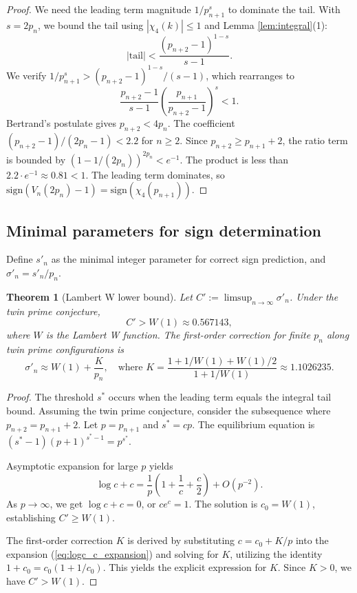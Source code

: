 \documentclass[12pt]{article}
\theoremstyle{plain}
\newtheorem{theorem}{Theorem}
\theoremstyle{definition}
\theoremstyle{remark}
\begin{document}
\begin{proof}
We need the leading term magnitude $1/p_{n+1}^s$ to dominate the tail. With $s = 2p_n$, we bound the tail using $|\chi_4(k)| \leq 1$ and Lemma \ref{lem:integral}(1):
\[
|\text{tail}| < \frac{(p_{n+2}-1)^{1-s}}{s-1}.
\]
We verify $1/p_{n+1}^s > (p_{n+2}-1)^{1-s}/(s-1)$, which rearranges to
\[
\frac{p_{n+2}-1}{s-1} \left(\frac{p_{n+1}}{p_{n+2}-1}\right)^s < 1.
\]
Bertrand's postulate gives $p_{n+2} < 4p_n$. The coefficient $(p_{n+2}-1)/(2p_n-1) < 2.2$ for $n \geq 2$. Since $p_{n+2} \geq p_{n+1} + 2$, the ratio term is bounded by $(1 - 1/(2p_n))^{2p_n} < e^{-1}$. The product is less than $2.2 \cdot e^{-1} \approx 0.81 < 1$.
The leading term dominates, so $\text{sign}(V_n(2p_n) - 1) = \text{sign}(\chi_4(p_{n+1}))$.
\end{proof}

\subsection{Minimal parameters for sign determination}

Define $s'_n$ as the minimal integer parameter for correct sign prediction, and $\sigma'_n = s'_n/p_n$.

\begin{theorem}[Lambert W lower bound]
\label{thm:lambert}
Let $C' := \limsup_{n \to \infty} \sigma'_n$. Under the twin prime conjecture,
\[
C' > W(1) \approx 0.567143,
\]
where $W$ is the Lambert W function. The first-order correction for finite $p_n$ along twin prime configurations is
\[
\sigma'_n \approx W(1) + \frac{K}{p_n}, \quad \text{where } K = \frac{1 + 1/W(1) + W(1)/2}{1 + 1/W(1)} \approx 1.1026235.
\]
\end{theorem}

\begin{proof}
The threshold $s^*$ occurs when the leading term equals the integral tail bound. Assuming the twin prime conjecture, consider the subsequence where $p_{n+2} = p_{n+1} + 2$. Let $p = p_{n+1}$ and $s^* = cp$. The equilibrium equation is $(s^*-1)(p+1)^{s^*-1} = p^{s^*}$.

Asymptotic expansion for large $p$ yields
\begin{equation}
\label{eq:logc_c_expansion}
\log c + c = \frac{1}{p}\left(1 + \frac{1}{c} + \frac{c}{2}\right) + O(p^{-2}).
\end{equation}
As $p \to \infty$, we get $\log c + c = 0$, or $c e^c = 1$. The solution is $c_0 = W(1)$, establishing $C' \geq W(1)$.

The first-order correction $K$ is derived by substituting $c = c_0 + K/p$ into the expansion (\ref{eq:logc_c_expansion}) and solving for $K$, utilizing the identity $1+c_0 = c_0(1+1/c_0)$. This yields the explicit expression for $K$. Since $K>0$, we have $C' > W(1)$.
\end{proof}
\end{document}
